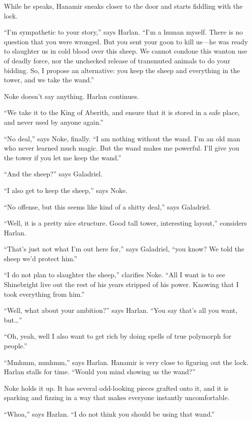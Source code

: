 \documentclass[smalldemyvopaper,11pt,twoside,onecolumn,openright,extrafontsizes]{memoir}
\begin{document}
While he speaks, Hanamir sneaks closer to the door and starts fiddling
with the lock.

``I'm sympathetic to your story,'' says Harlan. ``I'm a human myself.
There is no question that you were wronged. But you sent your goon to
kill us---he was ready to slaughter us in cold blood over this sheep. We
cannot condone this wanton use of deadly force, nor the unchecked
release of transmuted animals to do your bidding. So, I propose an
alternative: you keep the sheep and everything in the tower, and we take
the wand.''

Noke doesn't say anything. Harlan continues.

``We take it to the King of Aberith, and ensure that it is stored in a
safe place, and never used by anyone again.''

``No deal,'' says Noke, finally. ``I am nothing without the wand. I'm an
old man who never learned much magic. But the wand makes me powerful.
I'll give you the tower if you let me keep the wand.''

``And the sheep?'' says Galadriel.

``I also get to keep the sheep,'' says Noke.

``No offense, but this seems like kind of a shitty deal,'' says
Galadriel.

``Well, it is a pretty nice structure. Good tall tower, interesting
layout,'' considers Harlan.

``That's just not what I'm out here for,'' says Galadriel, ``you know?
We told the sheep we'd protect him.''

``I do not plan to slaughter the sheep,'' clarifies Noke. ``All I want
is to see Shinebright live out the rest of his years stripped of his
power. Knowing that I took everything from him.''

``Well, what about your ambition?'' says Harlan. ``You say that's all
you want, but\ldots{}''

``Oh, yeah, well I also want to get rich by doing spells of true
polymorph for people.''

``Mmhmm, mmhmm,'' says Harlan. Hanamir is very close to figuring out the
lock. Harlan stalls for time. ``Would you mind showing us the wand?''

Noke holds it up. It has several odd-looking pieces grafted onto it, and
it is sparking and fizzing in a way that makes everyone instantly
uncomfortable.

``Whoa,'' says Harlan. ``I do not think you should be using that wand.''
\end{document}
